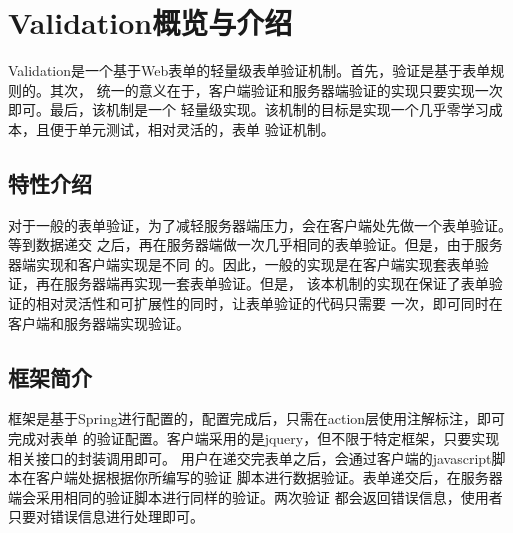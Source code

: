 
\section{Validation概览与介绍}
Validation是一个基于Web表单的轻量级表单验证机制。首先，验证是基于表单规则的。其次，
统一的意义在于，客户端验证和服务器端验证的实现只要实现一次即可。最后，该机制是一个
轻量级实现。该机制的目标是实现一个几乎零学习成本，且便于单元测试，相对灵活的，表单
验证机制。

\subsection{特性介绍}
对于一般的表单验证，为了减轻服务器端压力，会在客户端处先做一个表单验证。等到数据递交
之后，再在服务器端做一次几乎相同的表单验证。但是，由于服务器端实现和客户端实现是不同
的。因此，一般的实现是在客户端实现套表单验证，再在服务器端再实现一套表单验证。但是，
该本机制的实现在保证了表单验证的相对灵活性和可扩展性的同时，让表单验证的代码只需要
一次，即可同时在客户端和服务器端实现验证。

\subsection{框架简介}
框架是基于Spring进行配置的，配置完成后，只需在action层使用注解标注，即可完成对表单
的验证配置。客户端采用的是jquery，但不限于特定框架，只要实现相关接口的封装调用即可。
用户在递交完表单之后，会通过客户端的javascript脚本在客户端处据根据你所编写的验证
脚本进行数据验证。表单递交后，在服务器端会采用相同的验证脚本进行同样的验证。两次验证
都会返回错误信息，使用者只要对错误信息进行处理即可。
